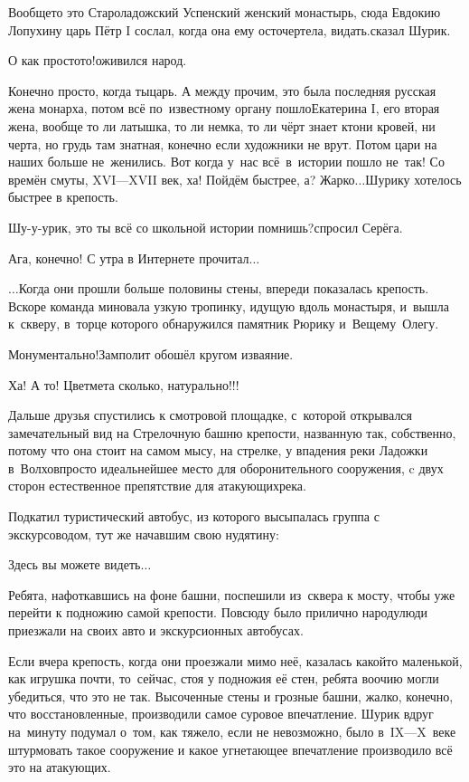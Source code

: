 \diagdash Вообще\sdash то это Староладожский Успенский женский монастырь, сюда Евдокию Лопухину царь Пётр I сослал, когда она ему осточертела, видать.\mdash сказал Шурик.

\diagdash О как просто\sdash то!\mdash оживился народ.

\diagdash Конечно просто, когда ты\mdash царь. А между прочим, это была последняя русская жена монарха, потом всё по~известному органу пошло\mdash Екатерина I, его вторая жена, вообще то ли латышка, то ли немка, то ли чёрт знает кто\mdash ни кровей, ни черта, но грудь там знатная, конечно если художники не врут. Потом цари на наших больше не~женились. Вот когда у~нас всё~в~истории пошло не~так! Со времён смуты, XVI\thinspace\nobreakdash---\thinspace XVII век, ха! Пойдём быстрее, а? Жарко$\ldots$\mdash Шурику  хотелось быстрее в крепость.

\diagdash Шу-у-урик, это ты всё со школьной истории помнишь?\mdash спросил Серёга.

\diagdash Ага, конечно! С утра в Интернете прочитал$\ldots$

\vspace{1.0cm}
$\ldots$Когда они прошли больше половины стены, впереди показалась крепость. Вскоре команда миновала узкую тропинку, идущую вдоль монастыря, и~вышла к~скверу, в~торце которого обнаружился памятник Рюрику и~Вещему~Олегу. 

\diagdash Монументально!\mdash Замполит обошёл кругом изваяние.

\diagdash Ха! А то! Цветмета сколько, натурально!!!

Дальше друзья спустились к смотровой площадке, с~которой открывался замечательный вид на Стрелочную башню крепости, названную так, собственно, потому что она стоит на самом мысу, на стрелке, у впадения реки Ладожки в~Волхов\mdash просто идеальнейшее место для оборонительного сооружения, c двух сторон естественное препятствие для атакующих\mdash река.

Подкатил туристический автобус, из которого высыпалась группа с экскурсоводом, тут же начавшим свою нудятину:

\diagdash Здесь вы можете видеть$\ldots$

Ребята, нафоткавшись на фоне башни, поспешили из~сквера к мосту, чтобы уже перейти к подножию самой крепости. Повсюду было прилично народу\mdash люди приезжали на своих авто и экскурсионных автобусах.

Если вчера крепость, когда они проезжали мимо неё, казалась какой\sdash то маленькой, как игрушка почти, то~сейчас, стоя у подножия её стен, ребята воочию могли убедиться, что это не так. Высоченные стены и грозные башни, жалко, конечно, что восстановленные, производили самое суровое впечатление. Шурик вдруг на~минуту подумал о~том, как тяжело, если не невозможно, было в~IX\thinspace\nobreakdash---\thinspace X~веке штурмовать такое сооружение и какое угнетающее впечатление производило всё это на атакующих.

